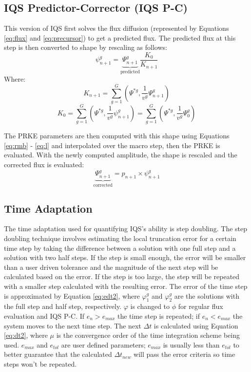 \documentclass{anstrans}
\newcommand{\be}{\begin{equation}}
\newcommand{\ee}{\end{equation}}
\begin{document}
\subsection{IQS Predictor-Corrector (IQS P-C)}

This version of IQS first solves the flux diffusion (represented by Equations \ref{eq:flux} and \ref{eq:precursor}) to get a predicted flux.  The predicted flux at this step is then converted to shape by rescaling as follows:
\be
\psi^g_{n+1} = \underbrace{\Psi^g_{n+1}}_{\text{predicted}} \frac{K_0}{K_{n+1}}
\label{eq:rescale}
\ee
Where:
\be
K_{n+1} =\sum_{g=1}^G\left(\Psi^{*g},\frac{1}{v^g}\Psi^g_{n+1}\right)
\ee
\be
K_{0} =\sum_{g=1}^G\left(\Psi^{*g},\frac{1}{v^g}\psi^g_{n+1}\right)=\sum_{g=1}^G\left(\Psi^{*g},\frac{1}{v^g}\Psi^g_{0}\right)
\ee

The PRKE parameters are then computed with this shape using Equations \ref{eq:rmb} - \ref{eq:l} and interpolated over the macro step, then the PRKE is evaluated.  With the newly computed amplitude, the shape is rescaled and the corrected flux is evaluated:
\be
\underbrace{\Psi^g_{n+1}}_{\text{corrected}} = p_{n+1} \times \psi^g_{n+1}
\ee

\subsection{Time Adaptation}

The time adaptation used for quantifying IQS's ability is step doubling.  The step doubling technique involves estimating the local truncation error for a certain time step by taking the difference between a solution with one full step and a solution with two half steps.  If the step is small enough, the error will be smaller than a user driven tolerance and the magnitude of the next step will be calculated based on the error.  If the step is too large, the step will be repeated with a smaller step calculated with the resulting error.  The error of the time step is approximated by Equation \ref{eq:edt2}, where $\varphi^g_1$ and $\varphi^g_2$ are the solutions with the full step and half step, respectively.  $\varphi$ is changed to $\phi$ for regular flux evaluation and IQS P-C.  If $e_n > e_{max}$ the time step is repeated; if $e_n < e_{max}$ the system moves to the next time step.  The next $\Delta t$ is calculated using Equation \ref{eq:dt2}, where $\mu$ is the convergence order of the time integration scheme being used.  $e_{max}$ and $e_{tol}$ are user defined parameters; $e_{max}$ is usually less than $e_{tol}$ to better guarantee that the calculated $\Delta t_{new}$ will pass the error criteria so time steps won't be repeated.
\end{document}

